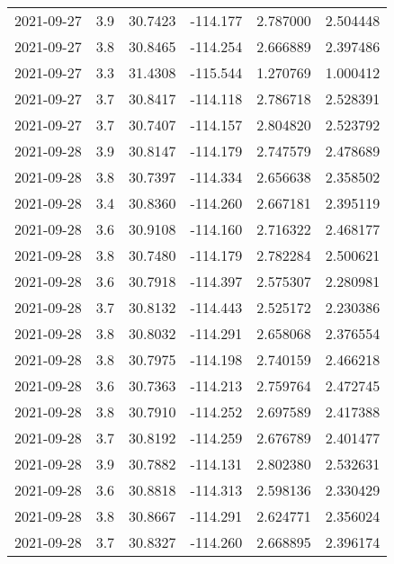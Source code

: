 \begin{tabular}{lrrrrr}
2021-09-27 &       3.9 &  30.7423 &  -114.177 &         2.787000 &         2.504448 \\
2021-09-27 &       3.8 &  30.8465 &  -114.254 &         2.666889 &         2.397486 \\
2021-09-27 &       3.3 &  31.4308 &  -115.544 &         1.270769 &         1.000412 \\
2021-09-27 &       3.7 &  30.8417 &  -114.118 &         2.786718 &         2.528391 \\
2021-09-27 &       3.7 &  30.7407 &  -114.157 &         2.804820 &         2.523792 \\
2021-09-28 &       3.9 &  30.8147 &  -114.179 &         2.747579 &         2.478689 \\
2021-09-28 &       3.8 &  30.7397 &  -114.334 &         2.656638 &         2.358502 \\
2021-09-28 &       3.4 &  30.8360 &  -114.260 &         2.667181 &         2.395119 \\
2021-09-28 &       3.6 &  30.9108 &  -114.160 &         2.716322 &         2.468177 \\
2021-09-28 &       3.8 &  30.7480 &  -114.179 &         2.782284 &         2.500621 \\
2021-09-28 &       3.6 &  30.7918 &  -114.397 &         2.575307 &         2.280981 \\
2021-09-28 &       3.7 &  30.8132 &  -114.443 &         2.525172 &         2.230386 \\
2021-09-28 &       3.8 &  30.8032 &  -114.291 &         2.658068 &         2.376554 \\
2021-09-28 &       3.8 &  30.7975 &  -114.198 &         2.740159 &         2.466218 \\
2021-09-28 &       3.6 &  30.7363 &  -114.213 &         2.759764 &         2.472745 \\
2021-09-28 &       3.8 &  30.7910 &  -114.252 &         2.697589 &         2.417388 \\
2021-09-28 &       3.7 &  30.8192 &  -114.259 &         2.676789 &         2.401477 \\
2021-09-28 &       3.9 &  30.7882 &  -114.131 &         2.802380 &         2.532631 \\
2021-09-28 &       3.6 &  30.8818 &  -114.313 &         2.598136 &         2.330429 \\
2021-09-28 &       3.8 &  30.8667 &  -114.291 &         2.624771 &         2.356024 \\
2021-09-28 &       3.7 &  30.8327 &  -114.260 &         2.668895 &         2.396174 \\

\end{tabular}
